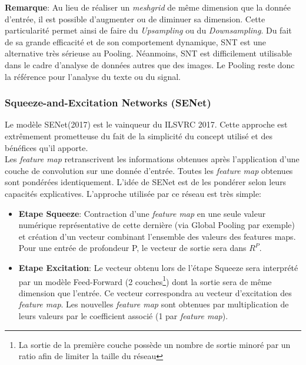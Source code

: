 \noindent \textbf{Remarque}: Au lieu de réaliser un \textit{meshgrid} de même dimension que la donnée d'entrée, il est possible d'augmenter ou de diminuer sa dimension. Cette particularité permet ainsi de faire du \textit{Upsampling} ou du \textit{Downsampling}. Du fait de sa grande efficacité et de son comportement dynamique, SNT est une alternative très sérieuse au Pooling. Néanmoins, SNT est difficilement utilisable dans le cadre d'analyse de données autres que des images. Le Pooling reste donc la référence pour l'analyse du texte ou du signal.

\subsubsection{Squeeze-and-Excitation Networks (SENet)}
\noindent Le modèle SENet\cite{senet}(2017) est le vainqueur du ILSVRC 2017. Cette approche est extrêmement prometteuse du fait de la simplicité du concept utilisé et des bénéfices qu'il apporte.\\

\noindent Les \textit{feature map} retranscrivent les informations obtenues après l'application d'une couche de convolution sur une donnée d'entrée. Toutes les \textit{feature map} obtenues sont pondérées identiquement. L'idée de SENet est de les pondérer selon leurs capacités explicatives. L'approche utilisée par ce réseau est très simple:

\begin{itemize}
    \item \textbf{Etape Squeeze}: Contraction d'une \textit{feature map} en une seule valeur numérique représentative de cette dernière (via Global Pooling par exemple) et création d'un vecteur combinant l'ensemble des valeurs des features maps. Pour une entrée de profondeur P, le vecteur de sortie sera dans $R^P$.

    \item \textbf{Etape Excitation}: Le vecteur obtenu lors de l'étape Squeeze sera interprété par un modèle Feed-Forward (2 couches\footnote{La sortie de la première couche possède un nombre de sortie minoré par un ratio afin de limiter la taille du réseau}) dont la sortie sera de même dimension que l'entrée. Ce vecteur correspondra au vecteur d'excitation des \textit{feature map}. Les nouvelles \textit{feature map} sont obtenues par multiplication de leurs valeurs par le coefficient associé (1 par \textit{feature map}).
\end{itemize}


